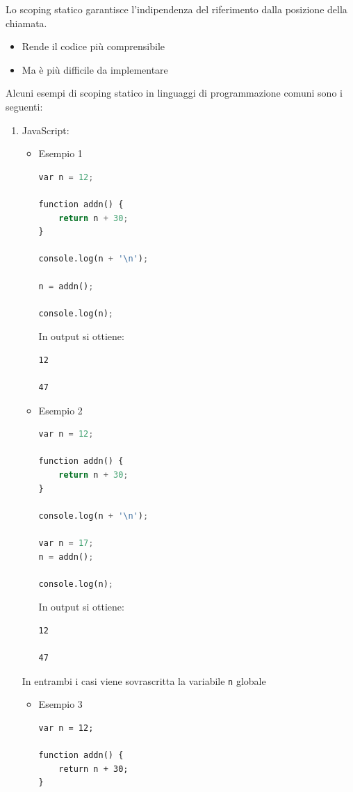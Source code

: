 \documentclass[a4paper]{article}
\begin{document}
{
  Lo scoping statico garantisce l'indipendenza del riferimento dalla posizione della
  chiamata.
  \begin{itemize}
    \item Rende il codice più comprensibile
    \item Ma è più difficile da implementare
  \end{itemize}
}

\vspace{1em}
\noindent
\begin{Example}{}{}
  Alcuni esempi di scoping statico in linguaggi di programmazione comuni sono i seguenti:
  \begin{enumerate}
    \item JavaScript:
      \begin{itemize}
        \item Esempio 1
\begin{lstlisting}[language=Python]
var n = 12;

function addn() {
    return n + 30;
}

console.log(n + '\n');

n = addn();

console.log(n);
\end{lstlisting}
          In output si ottiene:
\begin{lstlisting}
12

47
\end{lstlisting}

        \item Esempio 2
\begin{lstlisting}[language=Python]
var n = 12;

function addn() {
    return n + 30;
}

console.log(n + '\n');

var n = 17;
n = addn();

console.log(n);
\end{lstlisting}
          In output si ottiene:
\begin{lstlisting}
12

47
\end{lstlisting}
      \end{itemize}
      In entrambi i casi viene sovrascritta la variabile \texttt{n} globale
      \begin{itemize}
        \item Esempio 3
\begin{lstlisting}
var n = 12;

function addn() {
    return n + 30;
}


\end{lstlisting}
\end{itemize}
\end{enumerate}
\end{Example}
\end{document}
